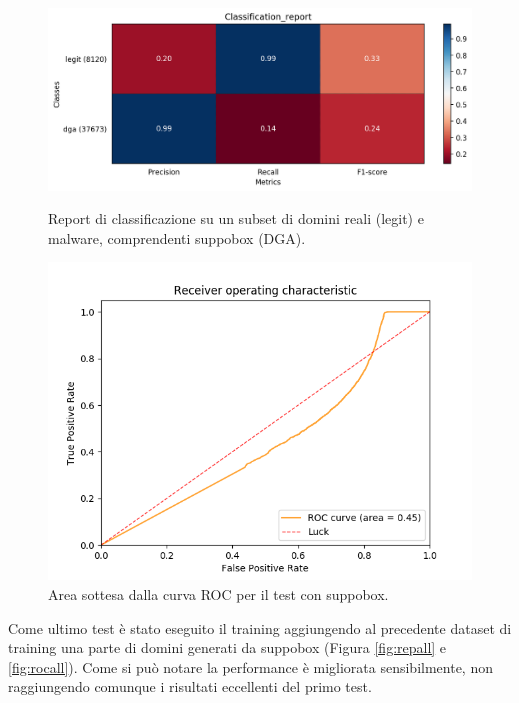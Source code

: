 \begin{figure}[!htbp]
    \centering
    \includegraphics[width=\columnwidth]{figures/rndf_tra_nosup_sup/class_rep.png}
    \caption{Report di classificazione su un subset di domini reali (legit) e malware, comprendenti suppobox (DGA).\label{fig:repsup}}

    \centering
    \includegraphics[width=\columnwidth]{figures/rndf_tra_nosup_sup/roc_plot.png}
    \caption{Area sottesa dalla curva ROC per il test con  suppobox.\label{fig:rocsup}}
\end{figure}

Come ultimo test è stato eseguito il training aggiungendo al precedente dataset di training una parte di domini generati da suppobox (Figura \ref{fig:repall} e \ref{fig:rocall}). Come si può notare la performance è migliorata sensibilmente, non raggiungendo comunque i risultati eccellenti del primo test.

